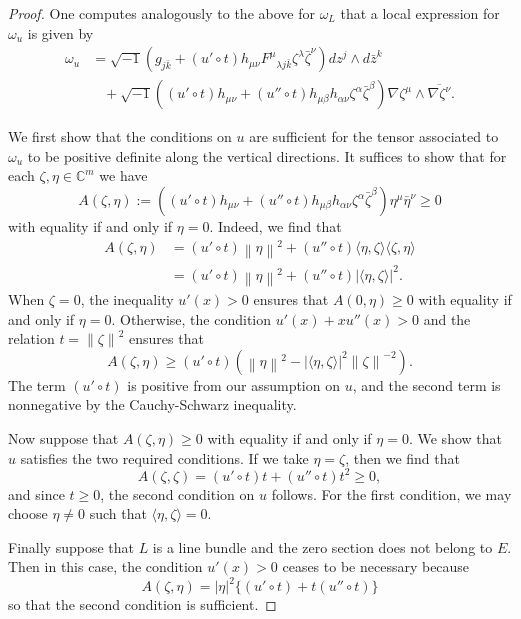 \documentclass{article}
\numberwithin{equation}{section}
\theoremstyle{definition}
\theoremstyle{theorem}
\newcommand{\norm}[1]{\left\lVert#1\right\rVert}
\begin{document}
\begin{proof}
One computes analogously to the above for $\omega_L$ that a local expression for $\omega_u$ is given by 
\begin{align*}
\omega_u &= \sqrt{-1}(g_{j \bar{k}} + (u' \circ t) h_{\mu \nu}F^\mu{}_{\lambda j\bar{k}} \zeta^\lambda \bar{\zeta}^\nu) dz^j \wedge d\bar{z}^k  \\
&\;\;\; + \sqrt{-1}((u' \circ t)h_{\mu \nu} + (u'' \circ t) h_{\mu \beta} h_{\alpha \nu} \zeta^\alpha \bar{\zeta}^\beta) \nabla \zeta^\mu \wedge \overline{\nabla \zeta^\nu}.
\end{align*}

We first show that the conditions on $u$ are sufficient for the tensor associated to $\omega_u$ to be positive definite along the vertical directions. It suffices to show that for each $\zeta, \eta \in \mathbb{C}^m$ we have 
\[
A(\zeta, \eta) := ((u' \circ t)h_{\mu \nu} + (u'' \circ t) h_{\mu \beta} h_{\alpha \nu} \zeta^\alpha \bar{\zeta}^\beta) \eta^\mu \bar{\eta}^\nu \geqslant 0
\]
with equality if and only if $\eta = 0$. Indeed, we find that
\begin{align*}
A(\zeta, \eta) &= (u' \circ t)  \norm{\eta}^2 + (u'' \circ t) \langle \eta, \zeta \rangle \langle \zeta, \eta \rangle  \\
&= (u' \circ t) \norm{\eta}^2 + (u'' \circ t) |\langle \eta, \zeta \rangle |^2.
\end{align*}
When $\zeta = 0$, the inequality $u'(x) > 0$ ensures that $A(0, \eta) \geqslant 0$ with equality if and only if $\eta = 0$. Otherwise, the condition $u'(x) + x u''(x) > 0$ and the relation $t = \norm{\zeta}^2$ ensures that 
\[
A(\zeta, \eta) \geqslant (u' \circ t) (\norm{\eta}^2 - |\langle \eta, \zeta \rangle|^2 \norm{\zeta}^{-2}).
\]
The term $(u' \circ t)$ is positive from our assumption on $u$, and the second term is nonnegative by the Cauchy-Schwarz inequality. 

Now suppose that $A(\zeta, \eta) \geqslant 0$ with equality if and only if $\eta = 0$. We show that $u$ satisfies the two required conditions.  If we take $\eta = \zeta$, then we find that 
\[
A(\zeta, \zeta) = (u' \circ t) t + (u'' \circ t) t^2 \geqslant 0,
\]
and since $t \geqslant 0$, the second condition on $u$ follows.  For the first condition, we may choose $\eta \ne 0$ such that $\langle \eta, \zeta \rangle = 0$. 

Finally suppose that $L$ is a line bundle and the zero section does not belong to $E$. Then in this case, the condition $u'(x) > 0$ ceases to be necessary because 
\[
A(\zeta, \eta) = |\eta|^2 \{ (u' \circ t) +t (u'' \circ t) \}
\]
so that the second condition is sufficient. 
\end{proof}
\end{document}
